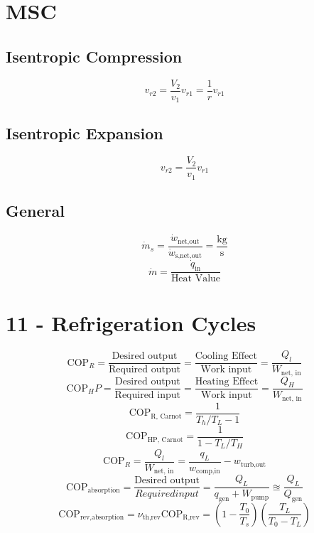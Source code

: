 \documentclass[10pt,landscape]{article}
\begin{document}
\begin{multicols}{3}
\section{MSC}
\subsection{Isentropic Compression}
\begin{equation}
    v_{r2}=\frac{V_2}{v_1}v_{r1}=\frac{1}{r}v_{r1}
\end{equation}
\subsection{Isentropic Expansion}
\begin{equation}
    v_{r2}=\frac{V_2}{v_1}v_{r1}
\end{equation}
\subsection{General}
\begin{equation}
    \dot{m}_s=\frac{\dot{w}_{\text{net,out}}}{\dot{w}_{\text{s,net,out}}}=\frac{\text{kg}}{\text{s}}
\end{equation}
\begin{equation}
    \dot{m}=\frac{\dot{q}_{\text{in}}}{\text{Heat Value}}    
\end{equation}

\section{11 - Refrigeration Cycles}
\begin{equation}
    \text{COP}_R=\frac{\text{Desired output}}{\text{Required output}}=\frac{\text{Cooling Effect}}{\text{Work input}}=\frac{Q_l}{W_{\text{net, in}}}
\end{equation}
\begin{equation}
    \text{COP}_HP=\frac{\text{Desired output}}{\text{Required input}}=\frac{\text{Heating Effect}}{\text{Work input}}=\frac{Q_H}{W_{\text{net, in}}}
\end{equation}
\begin{equation}
    \text{COP}_{\text{R, Carnot}}=\frac{1}{T_h/T_L-1}
\end{equation}
\begin{equation}
    \text{COP}_{\text{HP, Carnot}}=\frac{1}{1-T_L/T_H}
\end{equation}
\begin{equation}
    \text{COP}_R=\frac{Q_l}{W_{\text{net, in}}}=\frac{q_L}{w_{\text{comp,in}}}-w_{\text{turb,out}}
\end{equation}
\begin{equation}
    \text{COP}_{\text{absorption}}=\frac{\text{Desired output}}{Required input}=\frac{Q_L}{q_{\text{gen}}+W_{\text{pump}}}\approxeq\frac{Q_L}{Q_{\text{gen}}}
\end{equation}
\begin{equation}
    \text{COP}_{\text{rev,absorption}}=\nu_{\text{th,rev}}\text{COP}_{\text{R,rev}}=(1-\frac{T_0}{T_s})(\frac{T_L}{T_0-T_L})
\end{equation}

\end{multicols}
\end{document}
